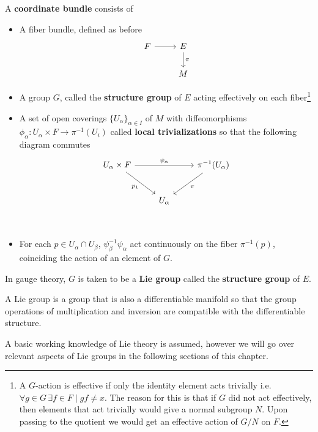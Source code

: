 	\begin{defn}
		A \textbf{coordinate bundle} consists of 
		\begin{itemize}
			\item A fiber bundle, defined as before
			\[
			\begin{tikzcd}
				F \arrow[r] & E  \arrow[d,"\pi"] \\ 
				& M
			\end{tikzcd}
			\]
			\item A group $G$, called the \textbf{structure group} of $E$ acting effectively on each fiber\footnote{A $G$-action is effective if only the identity element acts trivially i.e. $\forall g\in G \, \exists f \in F \mid gf \neq x$. The reason for this is that if $G$ did not act effectively, then elements that act trivially would give a normal subgroup $N$. Upon passing to the quotient we would get an effective action of $G/N$ on $F$.}
			\item A set of open coverings $\{ U_\alpha \}_{\alpha \in I}$ of $M$ with diffeomorphisms $\phi_\alpha: U_\alpha \times F \rightarrow \pi^{-1} (U_i)$ called \textbf{local trivializations} so that the following diagram commutes
			\[
			\begin{tikzcd}[row sep=2.5em]
			U_\alpha \times F \arrow[dr,swap,"p_1"] \arrow{rr}{\psi_\alpha} && \pi^{-1}(U_\alpha) \arrow{dl}{\pi} \\
			 & U_\alpha \\
			\end{tikzcd}
			\]
			\item For each $p \in U_\alpha \cap U_\beta$, $\psi_\beta^{-1} \psi_\alpha$ act continuously on the fiber $\pi^{-1}(p)$, coinciding the action of an element of $G$.
		\end{itemize}
		
	\end{defn}
		
	In gauge theory, $G$ is taken to be a \textbf{Lie group} called the \textbf{structure group} of $E$.
	\begin{defn}
		A Lie group is a group that is also a differentiable manifold so that the group operations of multiplication and inversion are compatible with the  differentiable structure. 
	\end{defn}
	A basic working knowledge of Lie theory is assumed, however we will go over relevant aspects of Lie groups in the following sections of this chapter.
	
